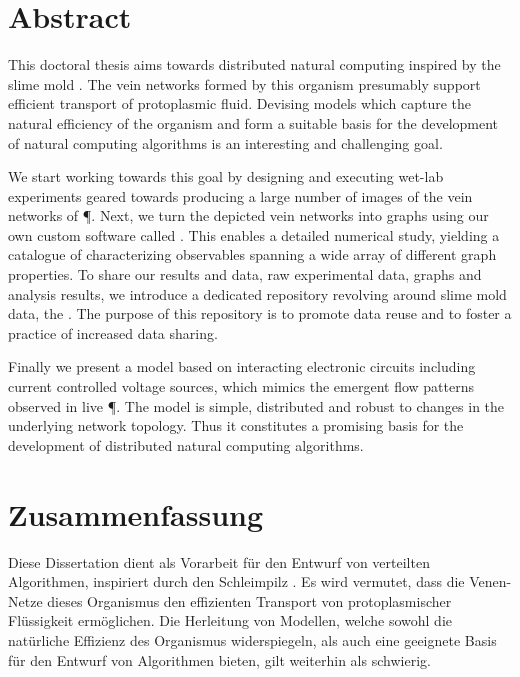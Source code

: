 \null\vfill

\section*{Abstract}
	
	This doctoral thesis aims towards distributed natural computing inspired by the slime mold \Pp. The vein networks formed by this organism presumably support efficient transport of protoplasmic fluid. Devising models which capture the natural efficiency of the organism and form a suitable basis for the development of natural computing algorithms is an interesting and challenging goal.
	
	We start working towards this goal by designing and executing wet-lab experiments geared towards producing a large number of images of the vein networks of \P. Next, we turn the depicted vein networks into graphs using our own custom software called \NEFI. This enables a detailed numerical study, yielding a catalogue of characterizing observables spanning a wide array of different graph properties. To share our results and data, \ie raw experimental data, graphs and analysis results, we introduce a dedicated repository revolving around slime mold data, the \SMGR. The purpose of this repository is to promote data reuse and to foster a practice of increased data sharing. 

	Finally we present a model based on interacting electronic circuits including current controlled voltage sources, which mimics the emergent flow patterns observed in live \P. The model is simple, distributed and robust to changes in the underlying network topology. Thus it constitutes a promising basis for the development of distributed natural computing algorithms.

\vfill

\newpage

\null\vfill

\section*{Zusammenfassung}

	Diese Dissertation dient als Vorarbeit für den Entwurf von verteilten Algorithmen, inspiriert durch den Schleimpilz \Pp. Es wird vermutet, dass die Venen-Netze dieses Organismus den effizienten Transport von protoplasmischer Flüssigkeit ermöglichen. Die Herleitung von Modellen, welche sowohl die natürliche Effizienz des Organismus widerspiegeln, als auch eine geeignete Basis für den Entwurf von Algorithmen bieten, gilt weiterhin als schwierig.


